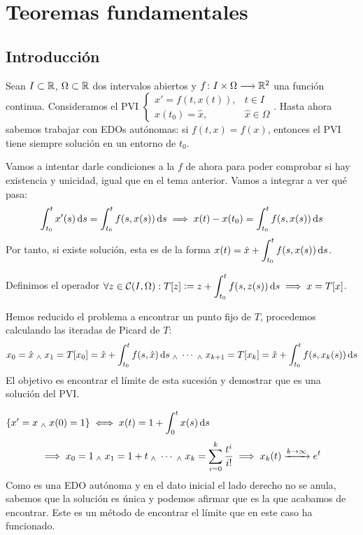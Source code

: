 
\section{Teoremas fundamentales}

\subsection{Introducción}

Sean $I\subset \mathbb{R}$, $\Omega \subset \mathbb{R}$ dos intervalos abiertos y $f \colon I\times \Omega \longrightarrow \mathbb{R}^2$ una función continua. Consideramos el PVI $\begin{cases}
		x'=f(t, x(t)) , & t\in I            \\
		x(t_0)=\hat{x}, & \hat{x}\in \Omega
	\end{cases}$.
Hasta ahora sabemos trabajar con EDOs autónomas: si  $f(t, x)=f(x)$, entonces el PVI tiene siempre solución en un entorno de $t_0$.

Vamos a intentar darle condiciones a la $f$ de ahora para poder comprobar si hay existencia y unicidad, igual que en el tema anterior. Vamos a integrar a ver qué pasa:
\[\int_{t_0}^{t} x'(s) \odif{s} = \int_{t_0}^{t} f(s, x(s)) \odif{s} \implies x(t) - x(t_0) = \int_{t_0}^{t} f(s, x(s)) \odif{s}\]
Por tanto, si existe solución, esta es de la forma $\ds x(t) = \hat{x} + \int_{t_0}^{t} f(s, x(s)) \odif{s}$.

Definimos el operador $\ds \forall z \in \mathcal{C}(I, \Omega) : T[z]\defeq z + \int_{t_0}^{t} f(s, z(s)) \odif{s} \implies x=T[x]$.

Hemos reducido el problema a encontrar un punto fijo de $T$, procedemos calculando las iteradas de Picard de $T$:
\[x_0 = \hat{x} \we x_1 = T[x_0] = \hat{x} + \int_{t_0}^{t} f(s, \hat{x}) \odif{s} \we \cdots \we x_{k+1} = T[x_k]= \hat{x} + \int_{t_0}^{t} f(s, x_k(s)) \odif{s}\]
El objetivo es encontrar el límite de esta sucesión y demostrar que es una solución del PVI.
\begin{ejem}
	$\ds\{x'=x \we x(0)=1\} \iff x(t)=1+\int_{0}^{t} x(s) \odif{s}$
	\[\implies x_0 = 1 \; _{\wedge} \; x_1 = 1 + t \; _{\wedge} \; \cdots \; _{\wedge} \; x_k = \sum_{i=0}^{k} \frac{t^i}{i!} \implies x_k(t)\xrightarrow{k\to\infty} e^t\]
	Como es una EDO autónoma y en el dato inicial el lado derecho no se anula, sabemos que la solución es única y podemos afirmar que es la que acabamos de encontrar. Este es un método de encontrar el límite que en este caso ha funcionado.
\end{ejem}

